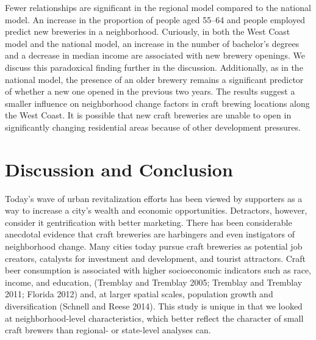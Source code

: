 \documentclass[]{article}
\begin{document}
Fewer relationships are significant in the regional model compared to
the national model. An increase in the proportion of people aged 55--64
and people employed predict new breweries in a neighborhood. Curiously,
in both the West Coast model and the national model, an increase in the
number of bachelor's degrees and a decrease in median income are
associated with new brewery openings. We discuss this paradoxical
finding further in the discussion. Additionally, as in the national
model, the presence of an older brewery remains a significant predictor
of whether a new one opened in the previous two years. The results
suggest a smaller influence on neighborhood change factors in craft
brewing locations along the West Coast. It is possible that new craft
breweries are unable to open in significantly changing residential areas
because of other development pressures.

\section{Discussion and Conclusion}\label{discussion-and-conclusion}

Today's wave of urban revitalization efforts has been viewed by
supporters as a way to increase a city's wealth and economic
opportunities. Detractors, however, consider it gentrification with
better marketing. There has been considerable anecdotal evidence that
craft breweries are harbingers and even instigators of neighborhood
change. Many cities today pursue craft breweries as potential job
creators, catalysts for investment and development, and tourist
attractors. Craft beer consumption is associated with higher
socioeconomic indicators such as race, income, and education, (Tremblay
and Tremblay 2005; Tremblay and Tremblay 2011; Florida 2012) and, at
larger spatial scales, population growth and diversification (Schnell
and Reese 2014). This study is unique in that we looked at
neighborhood-level characteristics, which better reflect the character
of small craft brewers than regional- or state-level analyses can.
\end{document}

